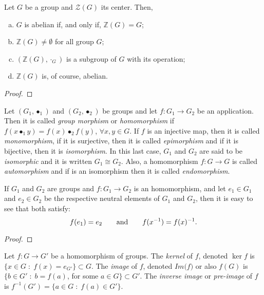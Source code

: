 \documentclass[../main.tex]{subfiles}
\begin{document}
\begin{prop}
Let $G$ be a group and $\mathcal{Z}(G)$ its center. Then,
\begin{enumerate}[(a)]
    \item $G$ is abelian if, and only if, $\mathbb{Z}(G) = G$;
    \item $\mathbb{Z}(G)\not=\emptyset$ for all group $G$;
    \item $(\mathbb{Z}(G),\cdotp_G)$ is a subgroup of $G$ with its operation;
    \item $\mathbb{Z}(G)$ is, of course, abelian.
\end{enumerate}
\end{prop}
\begin{proof}
\noproof
\end{proof}



\begin{defi}
[Homomorphism] Let $(G_1,\bullet_1)$ and $(G_2,\bullet_2)$ be groups and let $f:G_1\rightarrow G_2$ be an application. Then it is called \textit{group morphism} or \textit{homomorphism} if $f(x\bullet_1y) = f(x)\bullet_2f(y)$, $\forall x,y\in G$. If $f$ is an injective map, then it is called \textit{monomorphism}, if it is surjective, then it is called \textit{epimorphism} and if it is bijective, then it is \textit{isomorphism}. In this last case, $G_1$ and $G_2$ are said to be \textit{isomorphic} and it is written $G_1\cong G_2$. Also, a homomorphism $f:G\rightarrow G$ is called \textit{automorphism} and if is an isomorphism then it is called \textit{endomorphism}.
\end{defi}


\begin{nota}
If $G_1$ and $G_2$ are groups and $f:G_1\rightarrow G_2$ is an homomorphism, and let $e_1\in G_1$ and $e_2\in G_2$ be the respective neutral elements of $G_1$ and $G_2$, then it is easy to see that both satisfy:
\begin{equation}
    \notag
    f(e_1) = e_2\qquad \text{and}\qquad f(x^{-1}) = f(x)^{-1}.
\end{equation}
\end{nota}
\begin{proof}
\noproof
\end{proof}


\begin{defi}
Let $f:G\rightarrow G'$ be a homomorphism of groups. The \textit{kernel} of $f$, denoted $\ker f$ is $\{x\in G\;:\;f(x) = e_{G'}\}\subset G$. The \textit{image} of $f$, denoted $\textit{Im(f)}$ or also $f(G)$ is $\{b\in G'\;:\;b = f(a)$, for some $a\in G\}\subset G'$. The \textit{inverse image} or \textit{pre-image} of $f$ is $f^{-1}(G') = \{a\in G\;:\;f(a)\in G'\}$.
\end{defi}
\end{document}
